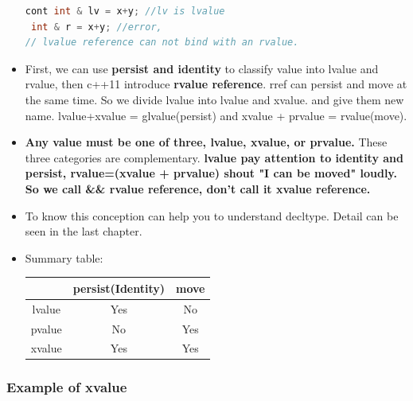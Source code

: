 \documentclass[a4paper,12pt,twoside]{book}
\begin{document}
\begin{itemize}
\begin{lstlisting}[frame=single, language=c++, mathescape=true]
cont int & lv = x+y; //lv is lvalue
 int & r = x+y; //error,
// lvalue reference can not bind with an rvalue.
\end{lstlisting}

\item First, we can use \textbf{persist and identity} to classify value into lvalue and rvalue, then c++11 introduce \textbf{rvalue reference}. rref can persist and move at the same time.  So we divide lvalue into lvalue and xvalue.  and give them new name.  lvalue+xvalue = glvalue(persist)  and xvalue + prvalue = rvalue(move).

\item \textbf{Any value must be one of three, lvalue, xvalue, or prvalue.} These three categories are complementary.  \textbf{lvalue pay attention to  identity and persist, rvalue=(xvalue + prvalue) shout "I can be moved" loudly.  So we call \&\& rvalue reference, don't call it xvalue reference. }

\item To know this conception can help you to understand decltype. Detail can be seen in the last chapter.

\item Summary table:
\begin{tabular}{|c|c|c|}
\hline
 & persist(Identity) & move \\
\hline
lvalue & Yes & No \\
\hline
pvalue & No & Yes \\
\hline
xvalue & Yes & Yes \\
\hline
\end{tabular}

\end{itemize}

\subsubsection{Example of xvalue}
\end{document}
